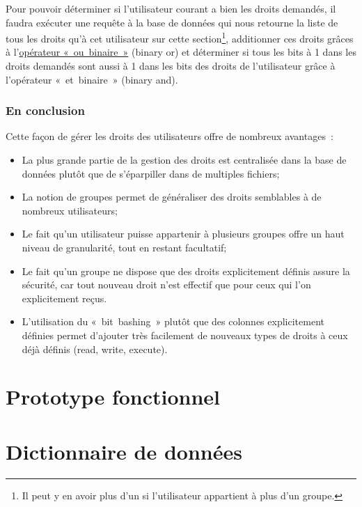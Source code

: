 \documentclass[letter, 11pt]{report}
\begin{document}
Pour pouvoir déterminer si l'utilisateur courant a bien les droits demandés, il faudra exécuter une requête à la base de données qui nous retourne la liste de tous les droits qu'à cet utilisateur sur cette section\footnote{Il peut y en avoir plus d'un si l'utilisateur appartient à plus d'un groupe.}, additionner ces droits grâces à l'\href{http://www.php.net/manual/en/language.operators.bitwise.php}{opérateur «~ou~binaire~»} (binary or) et déterminer si tous les bits à 1 dans les droits demandés sont aussi à 1 dans les bits des droits de l'utilisateur grâce à l'opérateur «~et~binaire~» (binary and).

\subsection{En conclusion}
Cette façon de gérer les droits des utilisateurs offre de nombreux avantages~:

\begin{itemize}
	\item La plus grande partie de la gestion des droits est centralisée dans la base de données plutôt que de s'éparpiller dans de multiples fichiers;
	\item La notion de groupes permet de généraliser des droits semblables à de nombreux utilisateurs;
	\item Le fait qu'un utilisateur puisse appartenir à plusieurs groupes offre un haut niveau de granularité, tout en restant facultatif;
	\item Le fait qu'un groupe ne dispose que des droits explicitement définis assure la sécurité, car tout nouveau droit n'est effectif que pour ceux qui l'on explicitement reçus.
	\item L'utilisation du «~bit~bashing~» plutôt que des colonnes explicitement définies permet d'ajouter très facilement de nouveaux types de droits à ceux déjà définis (read, write, execute).
\end{itemize}

\chapter{Prototype fonctionnel}

\appendix

\chapter{Dictionnaire de données}


\listoffigures
\listoftables
\end{document}
